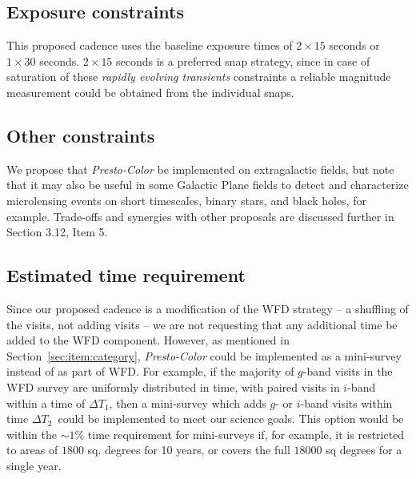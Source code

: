 \documentclass[12pt, letterpaper]{article}
\newcommand{\dtone}{\ensuremath{\Delta T_1}}
\newcommand{\dttwo}{\ensuremath{\Delta T_2}}
\begin{document}
\subsection{Exposure constraints}

\noindent This proposed cadence uses the baseline exposure times of $2\times15$ seconds or $1\times30$ seconds. $2\times15$ seconds is a preferred snap strategy, since in case of saturation of these {\em rapidly evolving transients} constraints a reliable magnitude measurement could be obtained from the individual snaps.

\subsection{Other constraints}

\noindent We propose that {\em Presto-Color} be implemented on extragalactic fields, but note that it may also be useful in some Galactic Plane fields to detect and characterize microlensing events on short timescales, binary stars, and black holes, for example. Trade-offs and synergies with other proposals are discussed further in Section 3.12, Item 5.


\subsection{Estimated time requirement}

\noindent Since our proposed cadence is a modification of the WFD strategy -- a shuffling of the visits, not adding visits -- we are not requesting that any additional time be added to the WFD component. However, as mentioned in Section~\ref{sec:item:category}, {\em Presto-Color} could be implemented as a mini-survey instead of as part of WFD. For example, if the majority of $g$-band visits in the WFD survey are uniformly distributed in time, with paired visits in $i$-band within a time of \dtone, then a mini-survey which adds $g$- or $i$-band visits within time \dttwo\ could be implemented to meet our science goals. This option would be within the $\sim 1\% $ time requirement for mini-surveys if, for example, it is restricted to areas of $1800$ sq. degrees for 10 years, or covers the full $18000$ sq degrees for a single year.
\end{document}
